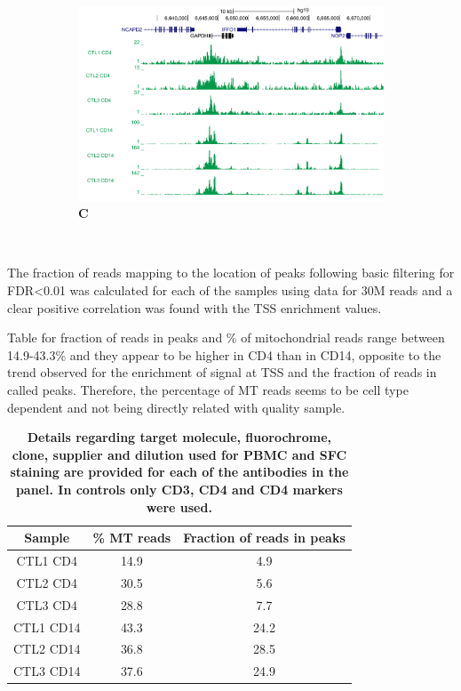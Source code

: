 \begin{figure}[htbp]
\begin{subfigure}{0.45\textwidth}
\centering
\includegraphics[width=\textwidth]{./Results1/pdfs/ATAC_Core_CD4_CD14_fresh_GAPDH}
\caption{\textbf{C}}
\end{subfigure}

\caption[Measurements for quality control assessment in ATAC-seq samples]{\textbf{} \\
}
\label{fig:QC_ATAC}
\end{figure}
	
The fraction of reads mapping to the location of peaks following basic filtering for FDR<0.01 was calculated for each of the samples using data for 30M reads and a clear positive correlation was found with the TSS enrichment values. 
	
Table for fraction of reads in peaks and \% of mitochondrial reads range between 14.9-43.3\% and they appear to be higher in CD4 than in CD14, opposite to the trend observed for the enrichment of signal at TSS and the fraction of reads in called peaks. Therefore, the percentage of MT reads seems to be cell type dependent and not being directly related with quality sample.
	
\begin{table}[htbp]
\begin{tabular}{@{} c c c}
\toprule
\textbf{Sample} & \textbf{\% MT reads} & \textbf{Fraction of reads in peaks} \\
\midrule
\midrule
CTL1 CD4 & 14.9 & 4.9 \\
CTL2 CD4 & 30.5 & 5.6 \\
CTL3 CD4 & 28.8 & 7.7 \\
CTL1 CD14 & 43.3 & 24.2 \\
CTL2 CD14 & 36.8 & 28.5 \\
CTL3 CD14 & 37.6 & 24.9 \\
\bottomrule
\end{tabular}
\medskip %
\caption[ATAC-seq percentage of MT reads and fraction of reads in called peaks]{\textbf{Details regarding target molecule, fluorochrome, clone, supplier and dilution used for PBMC and SFC staining are provided for each of the antibodies in the panel. In controls only CD3, CD4 and CD4 markers were used.}}
\label{tab:ATAC_MT_fraction_reads_in_peaks}
\end{table}
\bigskip %

